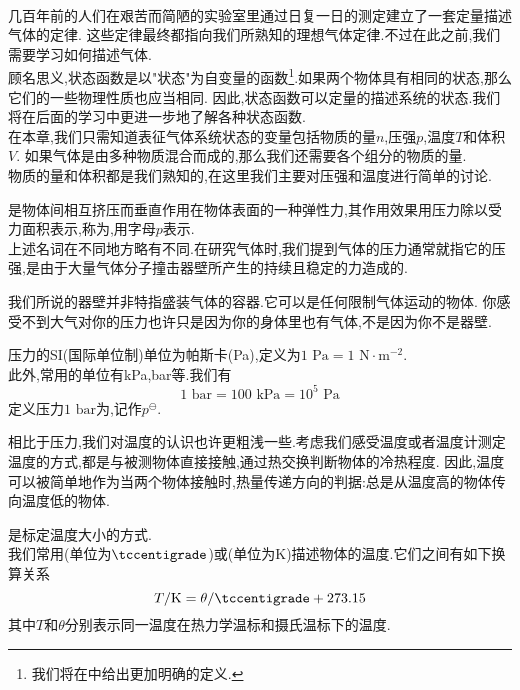 \documentclass{ctexart}
\begin{document}
\pagestyle{plain}
\noindent{}\vspace{15pt}\\
%
\indent 几百年前的人们在艰苦而简陋的实验室里通过日复一日的测定建立了一套定量描述气体的定律.%
这些定律最终都指向我们所熟知的理想气体定律.不过在此之前,我们需要学习如何描述气体.\vspace{12pt}\\
\indent 顾名思义,状态函数是以"状态"为自变量的函数\footnote{我们将在中给出更加明确的定义.}.如果两个物体具有相同的状态,那么它们的一些物理性质也应当相同.%
因此,状态函数可以定量的描述系统的状态.我们将在后面的学习中更进一步地了解各种状态函数.\\
\indent 在本章,我们只需知道表征气体系统状态的变量包括物质的量$n$,压强$p$,温度$T$和体积$V$.%
如果气体是由多种物质混合而成的,那么我们还需要各个组分的物质的量.\\
\indent 物质的量和体积都是我们熟知的,在这里我们主要对压强和温度进行简单的讨论.
\begin{definition}[1A.1.1 压力与压强]
    是物体间相互挤压而垂直作用在物体表面的一种弹性力,其作用效果用压力除以受力面积表示,称为,用字母$p$表示.\\
    上述名词在不同地方略有不同.在研究气体时,我们提到气体的压力通常就指它的压强,是由于大量气体分子撞击器壁所产生的持续且稳定的力造成的.
\end{definition}
我们所说的器壁并非特指盛装气体的容器.它可以是任何限制气体运动的物体.%
你感受不到大气对你的压力也许只是因为你的身体里也有气体,不是因为你不是器壁.
\begin{definition}
    压力的SI(国际单位制)单位为帕斯卡(Pa),定义为$1\text{ Pa}=1\text{ N}\cdot\text{m}^{-2}$.\\
    此外,常用的单位有kPa,bar等.我们有
    \[1\text{ bar}=100\text{ kPa}=10^5\text{ Pa}\]
    定义压力$1\text{ bar}$为,记作$p^\ominus$.
\end{definition}
相比于压力,我们对温度的认识也许更粗浅一些.考虑我们感受温度或者温度计测定温度的方式,都是与被测物体直接接触,通过热交换判断物体的冷热程度.%
因此,温度可以被简单地作为当两个物体接触时,热量传递方向的判据:总是从温度高的物体传向温度低的物体.
\begin{definition}[1A.1.3 温度的单位,温标]
    是标定温度大小的方式.\\
    我们常用(单位为$\tccentigrade$)或(单位为K)描述物体的温度.它们之间有如下换算关系
    \[T/\text{K}=\theta/\tccentigrade+273.15\]
    其中$T$和$\theta$分别表示同一温度在热力学温标和摄氏温标下的温度.
\end{definition}
\end{document}
